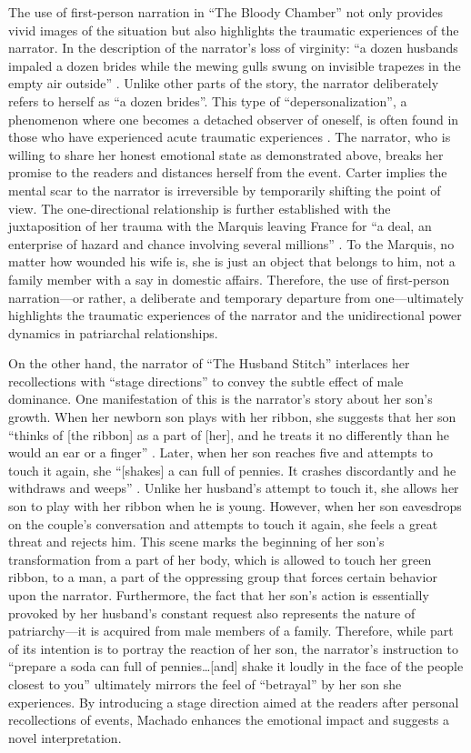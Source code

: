 \documentclass{mla}
\begin{document}
The use of first-person narration in ``The Bloody Chamber'' not only provides vivid images of the situation but also highlights the traumatic experiences of the narrator.
In the description of the narrator's loss of virginity: ``a dozen husbands impaled a dozen brides while the mewing gulls swung on invisible trapezes in the empty air outside'' \autocite[][15]{carter}.
Unlike other parts of the story, the narrator deliberately refers to herself as ``a dozen brides''.
This type of ``depersonalization'', a phenomenon where one becomes a detached observer of oneself, is often found in those who have experienced acute traumatic experiences \autocite{dissociation}.
The narrator, who is willing to share her honest emotional state as demonstrated above, breaks her promise to the readers and distances herself from the event.
Carter implies the mental scar to the narrator is irreversible by temporarily shifting the point of view.
The one-directional relationship is further established with the juxtaposition of her trauma with the Marquis leaving France for ``a deal, an enterprise of hazard and chance involving several millions'' \autocite[][16]{carter}.
To the Marquis, no matter how wounded his wife is, she is just an object that belongs to him, not a family member with a say in domestic affairs.
Therefore, the use of first-person narration---or rather, a deliberate and temporary departure from one---ultimately highlights the traumatic experiences of the narrator and the unidirectional power dynamics in patriarchal relationships.

On the other hand, the narrator of ``The Husband Stitch'' interlaces her recollections with ``stage directions'' to convey the subtle effect of male dominance.
One manifestation of this is the narrator's story about her son's growth. 
When her newborn son plays with her ribbon, she suggests that her son ``thinks of [the ribbon] as a part of [her], and he treats it no differently than he would an ear or a finger'' \autocite[][18]{machado}.
Later, when her son reaches five and attempts to touch it again, she ``[shakes] a can full of pennies. It crashes discordantly and he withdraws and weeps'' \autocite[][21]{machado}.
Unlike her husband's attempt to touch it, she allows her son to play with her ribbon when he is young.
However, when her son eavesdrops on the couple's conversation and attempts to touch it again, she feels a great threat and rejects him.
This scene marks the beginning of her son's transformation from a part of her body, which is allowed to touch her green ribbon, to a man, a part of the oppressing group that forces certain behavior upon the narrator.
Furthermore, the fact that her son's action is essentially provoked by her husband's constant request also represents the nature of patriarchy---it is acquired from male members of a family.
Therefore, while part of its intention is to portray the reaction of her son, the narrator's instruction to ``prepare a soda can full of pennies\ldots [and] shake it loudly in the face of the people closest to you'' \autocite[][21]{machado} ultimately mirrors the feel of ``betrayal'' by her son she experiences.
By introducing a stage direction aimed at the readers after personal recollections of events, Machado enhances the emotional impact and suggests a novel interpretation.
\end{document}

